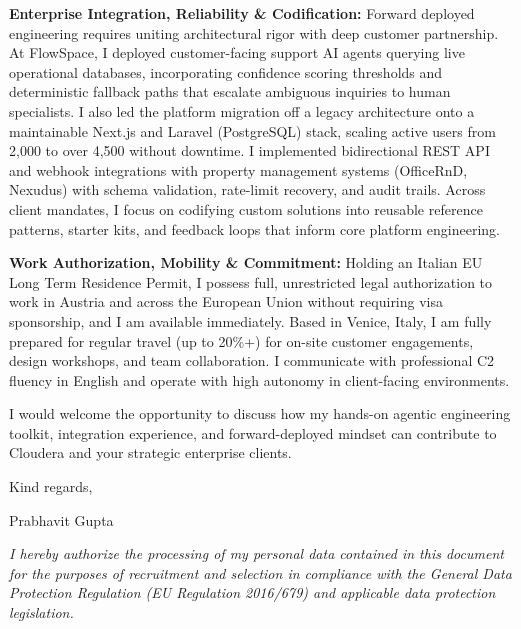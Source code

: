 \documentclass[10.5pt,a4paper]{article}
\begin{document}
\textbf{Enterprise Integration, Reliability \& Codification:} Forward deployed engineering requires uniting architectural rigor with deep customer partnership. At FlowSpace, I deployed customer-facing support AI agents querying live operational databases, incorporating confidence scoring thresholds and deterministic fallback paths that escalate ambiguous inquiries to human specialists. I also led the platform migration off a legacy architecture onto a maintainable Next.js and Laravel (PostgreSQL) stack, scaling active users from 2,000 to over 4,500 without downtime. I implemented bidirectional REST API and webhook integrations with property management systems (OfficeRnD, Nexudus) with schema validation, rate-limit recovery, and audit trails. Across client mandates, I focus on codifying custom solutions into reusable reference patterns, starter kits, and feedback loops that inform core platform engineering.

\textbf{Work Authorization, Mobility \& Commitment:} Holding an Italian EU Long Term Residence Permit, I possess full, unrestricted legal authorization to work in Austria and across the European Union without requiring visa sponsorship, and I am available immediately. Based in Venice, Italy, I am fully prepared for regular travel (up to 20\%+) for on-site customer engagements, design workshops, and team collaboration. I communicate with professional C2 fluency in English and operate with high autonomy in client-facing environments.

I would welcome the opportunity to discuss how my hands-on agentic engineering toolkit, integration experience, and forward-deployed mindset can contribute to Cloudera and your strategic enterprise clients.

Kind regards,

Prabhavit Gupta

\vspace{0.4em}
{\footnotesize \textit{I hereby authorize the processing of my personal data contained in this document for the purposes of recruitment and selection in compliance with the General Data Protection Regulation (EU Regulation 2016/679) and applicable data protection legislation.}\par}
\end{document}
